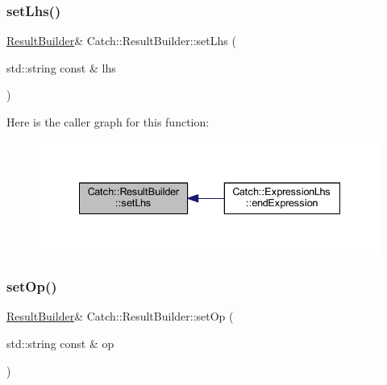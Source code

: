 \hypertarget{class_catch_1_1_result_builder_a5de584deec90fc6b7cc5bcf9eb636442}{}\label{class_catch_1_1_result_builder_a5de584deec90fc6b7cc5bcf9eb636442} 
\subsubsection{\texorpdfstring{set\+Lhs()}{setLhs()}}
{\footnotesize\ttfamily \hyperlink{class_catch_1_1_result_builder}{Result\+Builder}\& Catch\+::\+Result\+Builder\+::set\+Lhs (\begin{DoxyParamCaption}\item[{std\+::string const \&}]{lhs }\end{DoxyParamCaption})}

Here is the caller graph for this function\+:\nopagebreak
\begin{figure}[H]
\begin{center}
\leavevmode
\includegraphics[width=335pt]{class_catch_1_1_result_builder_a5de584deec90fc6b7cc5bcf9eb636442_icgraph}
\end{center}
\end{figure}
\hypertarget{class_catch_1_1_result_builder_a8232ed051ed7f6adfbc152c98aa1dc0c}{}\label{class_catch_1_1_result_builder_a8232ed051ed7f6adfbc152c98aa1dc0c} 
\subsubsection{\texorpdfstring{set\+Op()}{setOp()}}
{\footnotesize\ttfamily \hyperlink{class_catch_1_1_result_builder}{Result\+Builder}\& Catch\+::\+Result\+Builder\+::set\+Op (\begin{DoxyParamCaption}\item[{std\+::string const \&}]{op }\end{DoxyParamCaption})}

